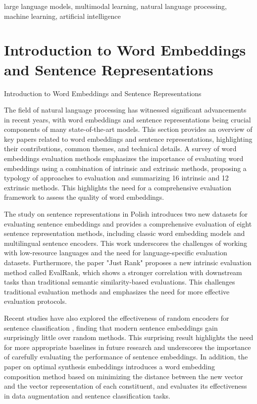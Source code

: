 \documentclass[conference]{IEEEtran}
\begin{document}
\begin{IEEEkeywords}
large language models, multimodal learning, natural language processing, machine learning, artificial intelligence
\end{IEEEkeywords}


\section{Introduction to Word Embeddings and Sentence Representations}
Introduction to Word Embeddings and Sentence Representations

The field of natural language processing has witnessed significant advancements in recent years, with word embeddings and sentence representations being crucial components of many state-of-the-art models. This section provides an overview of key papers related to word embeddings and sentence representations, highlighting their contributions, common themes, and technical details. A survey of word embeddings evaluation methods \cite{b1} emphasizes the importance of evaluating word embeddings using a combination of intrinsic and extrinsic methods, proposing a typology of approaches to evaluation and summarizing 16 intrinsic and 12 extrinsic methods. This highlights the need for a comprehensive evaluation framework to assess the quality of word embeddings.

The study on sentence representations in Polish \cite{b2} introduces two new datasets for evaluating sentence embeddings and provides a comprehensive evaluation of eight sentence representation methods, including classic word embedding models and multilingual sentence encoders. This work underscores the challenges of working with low-resource languages and the need for language-specific evaluation datasets. Furthermore, the paper "Just Rank" \cite{b3} proposes a new intrinsic evaluation method called EvalRank, which shows a stronger correlation with downstream tasks than traditional semantic similarity-based evaluations. This challenges traditional evaluation methods and emphasizes the need for more effective evaluation protocols.

Recent studies have also explored the effectiveness of random encoders for sentence classification \cite{b4}, finding that modern sentence embeddings gain surprisingly little over random methods. This surprising result highlights the need for more appropriate baselines in future research and underscores the importance of carefully evaluating the performance of sentence embeddings. In addition, the paper on optimal synthesis embeddings \cite{b5} introduces a word embedding composition method based on minimizing the distance between the new vector and the vector representation of each constituent, and evaluates its effectiveness in data augmentation and sentence classification tasks.
\end{document}
